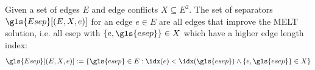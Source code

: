 

\begin{definition}[Separators]
  \label{def:separators}
  Given a set of edges \(E\) and edge conflicts \(X \subseteq E^2\). 
  The set of separators \(\gls{Esep}[(E, X, e)]\) for an edge 
  \(e \in E\) are all edges
  that improve the \gls{MELT} solution, i.e. all \gls{esep} with
  \(\{e,\gls{esep}\} \in X\) which have a higher edge length index:
  \[
	  \gls{Esep}[(E,X,e)] := \{
		  \gls{esep} \in E:
		  \idx(e) < \idx(\gls{esep}) \land \{e,\gls{esep}\} \in X
	  \}
  \]
\end{definition}





